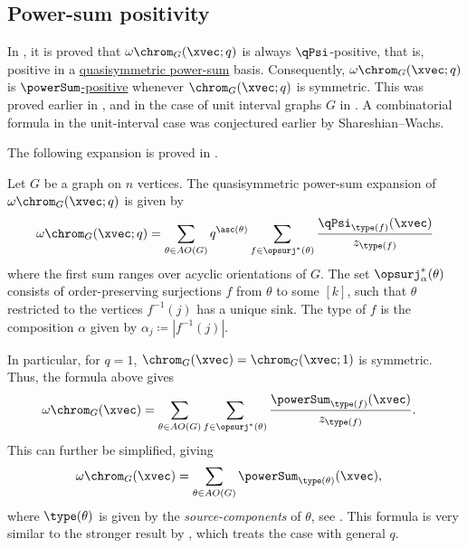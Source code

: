 \subsection[chromaticQuasisymmetricPowerSumExpansion]{Power-sum positivity}

In \cite{AlexanderssonSulzgruber2019},
it is proved that $\omega \chrom_G(\xvec;q)$ is always $\qPsi$-positive,
that is, positive in a \hyperref[qPsi]{quasisymmetric power-sum} basis.
Consequently, $\omega \chrom_G(\xvec;q)$ is
\hyperref[powerSum]{$\powerSum$-positive} whenever $\chrom_G(\xvec;q)$ is symmetric.
This was proved earlier in \cite{Ellzey2017}, and in the case of unit interval graphs $G$ in \cite{Athanasiadis2015}.
A combinatorial formula in the unit-interval case was conjectured earlier by Shareshian--Wachs.


The following expansion is proved in \cite{AlexanderssonSulzgruber2019}.
\begin{theorem}
Let $G$ be a graph on $n$ vertices.
The quasisymmetric power-sum expansion of $\omega \chrom_G(\xvec;q)$ is given by
\[
\omega \chrom_G(\xvec;q) = \sum_{\theta \in AO(G)} q^{\asc(\theta)}
\sum_{f \in \opsurj^{\ast}(\theta)} \frac{\qPsi_{\type(f)}(\xvec)}{z_{\type(f)}}
\]
where the first sum ranges over acyclic orientations of $G$.
The set $\opsurj_{\alpha}^{\ast}(\theta)$
consists of order-preserving surjections $f$ from $\theta$ to some $[k]$,
such that $\theta$ restricted to the vertices $f^{-1}(j)$ has a unique sink.
The type of $f$ is the composition $\alpha$ given by $\alpha_j \coloneqq |f^{-1}(j)|$.
\end{theorem}
In particular, for $q=1$, $\chrom_G(\xvec)  = \chrom_G(\xvec;1)$ is symmetric.
Thus, the formula above gives
\begin{align}
\omega \chrom_G(\xvec) &= \sum_{\theta \in AO(G)}
\sum_{f \in \opsurj^{\ast}(\theta)}
\frac{\powerSum_{\type(f)}(\xvec)}{z_{\type(f)}}.
\end{align}
This can further be simplified,
giving
\begin{align}
\omega \chrom_G(\xvec) &=\sum_{\theta \in AO(G)} \powerSum_{\type(\theta)}(\xvec),
\end{align}
where $\type(\theta)$ is given by the \emph{source-components}
of $\theta$, see \cite{BernardiNadeau2020}.
This formula is very similar to the stronger result by  \cite{Athanasiadis2015},
which treats the case with general $q$.


%
%
%


